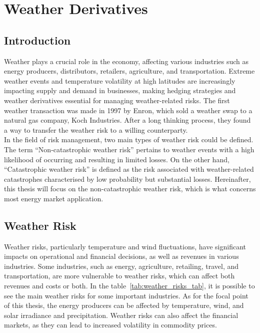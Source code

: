 
%

\chapter{Weather Derivatives}
\label{ch:weather_derivatives}

\glsresetall

\section{Introduction}
\label{sec:weather_intro}

    Weather plays a crucial role in the economy, affecting various industries such as energy producers,
    distributors, retailers, agriculture, and transportation.
    Extreme weather events and temperature volatility at high latitudes are increasingly impacting supply and demand
    in businesses, making hedging strategies and weather derivatives essential for managing weather-related risks.
    The first weather transaction was made in 1997 by Enron,
    which sold a weather swap to a natural gas company, Koch Industries.
    After a long thinking process,
    they found a way to transfer the weather risk to a willing counterparty\cite{barrieu_primer_2010}.\\

    In the field of risk management, two main types of weather risk could be defined\cite{leggio_using_2007}.
    The term ``Non-catastrophic weather risk'' pertains to weather events with a high likelihood
    of occurring and resulting in limited losses.
    On the other hand, ``Catastrophic weather risk'' is defined as the risk associated with weather-related catastrophes
    characterised by low probability but substantial losses.
    Hereinafter, this thesis will focus on the non-catastrophic weather risk,
    which is what concerns most energy market application.


\section{Weather Risk}
\label{sec:weather_risk}

    Weather risks, particularly temperature and wind fluctuations, have significant impacts on operational and financial
    decisions, as well as revenues in various industries.
    Some industries, such as energy, agriculture, retailing, travel, and transportation,
    are more vulnerable to weather risks, which can affect both revenues and costs or both.
    In the table~\ref{tab:weather_risks_tab}, it is possible to see the main weather risks for some important industries.
    As for the focal point of this thesis, the energy producers can be affected by temperature,
    wind, and solar irradiance and precipitation\cite{cui_applications_2015}.
    Weather risks can also affect the financial markets, as they can lead to increased volatility in commodity prices.


